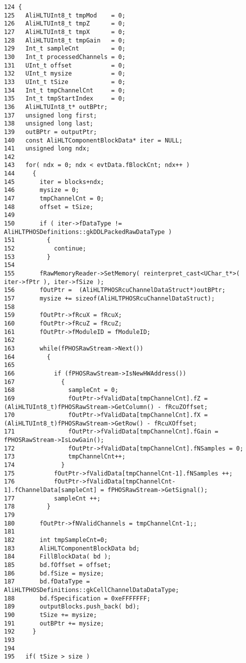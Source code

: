\footnotesize\begin{verbatim}124 {
125   AliHLTUInt8_t tmpMod    = 0;
126   AliHLTUInt8_t tmpZ      = 0;
127   AliHLTUInt8_t tmpX      = 0;
128   AliHLTUInt8_t tmpGain   = 0;
129   Int_t sampleCnt         = 0;
130   Int_t processedChannels = 0;
131   UInt_t offset           = 0; 
132   UInt_t mysize           = 0;
133   UInt_t tSize            = 0;
134   Int_t tmpChannelCnt     = 0;
135   Int_t tmpStartIndex     = 0;
136   AliHLTUInt8_t* outBPtr;
137   unsigned long first;
138   unsigned long last;
139   outBPtr = outputPtr;
140   const AliHLTComponentBlockData* iter = NULL; 
141   unsigned long ndx;
142 
143   for( ndx = 0; ndx < evtData.fBlockCnt; ndx++ )
144     {
145       iter = blocks+ndx;
146       mysize = 0;
147       tmpChannelCnt = 0;
148       offset = tSize;
149 
150       if ( iter->fDataType != AliHLTPHOSDefinitions::gkDDLPackedRawDataType )
151         {
152           continue;
153         }
154 
155       fRawMemoryReader->SetMemory( reinterpret_cast<UChar_t*>( iter->fPtr ), iter->fSize );
156       fOutPtr =  (AliHLTPHOSRcuChannelDataStruct*)outBPtr;
157       mysize += sizeof(AliHLTPHOSRcuChannelDataStruct);
158 
159       fOutPtr->fRcuX = fRcuX;
160       fOutPtr->fRcuZ = fRcuZ;
161       fOutPtr->fModuleID = fModuleID;
162 
163       while(fPHOSRawStream->Next())
164         {
165           
166           if (fPHOSRawStream->IsNewHWAddress())
167             {
168               sampleCnt = 0;
169               fOutPtr->fValidData[tmpChannelCnt].fZ = (AliHLTUInt8_t)fPHOSRawStream->GetColumn() - fRcuZOffset;
170               fOutPtr->fValidData[tmpChannelCnt].fX = (AliHLTUInt8_t)fPHOSRawStream->GetRow() - fRcuXOffset;
171               fOutPtr->fValidData[tmpChannelCnt].fGain = fPHOSRawStream->IsLowGain();
172               fOutPtr->fValidData[tmpChannelCnt].fNSamples = 0;
173               tmpChannelCnt++;
174             }
175           fOutPtr->fValidData[tmpChannelCnt-1].fNSamples ++;
176           fOutPtr->fValidData[tmpChannelCnt-1].fChannelData[sampleCnt] = fPHOSRawStream->GetSignal();
177           sampleCnt ++; 
178         }
179 
180       fOutPtr->fNValidChannels = tmpChannelCnt-1;;
181  
182       int tmpSampleCnt=0;
183       AliHLTComponentBlockData bd;
184       FillBlockData( bd );
185       bd.fOffset = offset;
186       bd.fSize = mysize;
187       bd.fDataType = AliHLTPHOSDefinitions::gkCellChannelDataDataType;
188       bd.fSpecification = 0xeFFFFFFF;
189       outputBlocks.push_back( bd);
190       tSize += mysize;
191       outBPtr += mysize;
192     }
193 
194   
195   if( tSize > size )

\end{verbatim}

